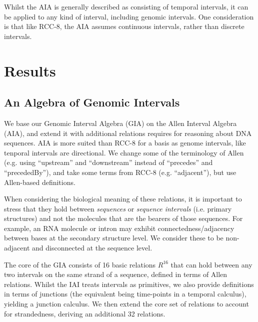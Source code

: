 \documentclass{article}
\begin{document}
Whilst the AIA is generally described as consisting of temporal
intervals, it can be applied to any kind of interval, including
genomic intervals. One consideration is that like RCC-8, the AIA
assumes continuous intervals, rather than discrete intervals.


\section{Results}

\subsection{An Algebra of Genomic Intervals}

We base our Genomic Interval Algebra (GIA) on the Allen Interval
Algebra (AIA), and extend it with additional relations requires for
reasoning about DNA sequences. AIA is more suited than RCC-8 for a
basis as genome intervals, like tenporal intervals are directional. We
change some of the terminology of Allen (e.g. using ``upstream'' and
``downstream'' instead of ``precedes'' and ``precededBy''), and take
some terms from RCC-8 (e.g. ``adjacent''), but use Allen-based
definitions.

When considering the biological meaning of these relations, it is
important to stress that they hold between {\em sequences} or
\emph{sequence intervals} (i.e. primary structures) and not the molecules that are the bearers
of those sequences. For example, an RNA molecule or intron may exhibit
connectedness/adjacency between bases at the secondary structure
level. We consider these to be non-adjacent and disconnected at the
sequence level. 

The core of the GIA consists of 16 basic relations $R^{16}$ that can hold
between any two intervals on the same strand of a sequence, defined in
terms of Allen relations. Whilst the IAI treats intervals as
primitives, we also provide definitions in terms of junctions (the
equivalent being time-points in a temporal calculus), yielding a
junction calculus.  We then extend the core set of relations to
account for strandedness, deriving an additional 32 relations.
\end{document}
